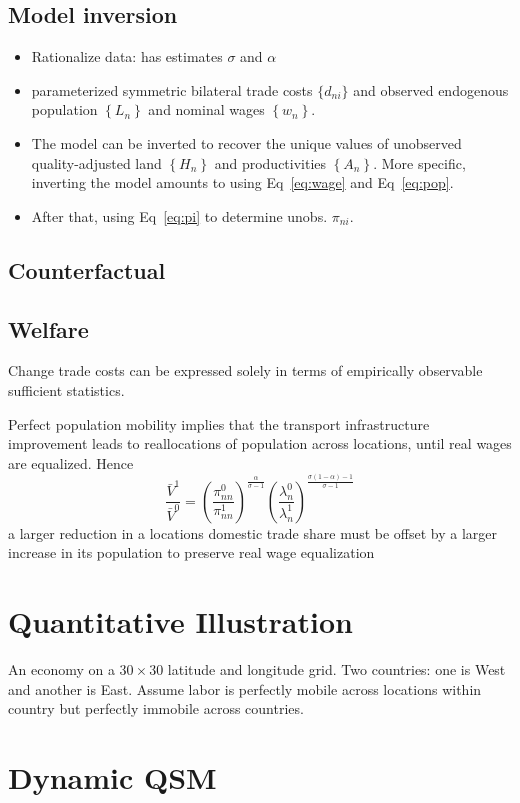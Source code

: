 \documentclass[11pt,a4paper]{article}
\begin{document}
\subsection{Model inversion}
\begin{itemize}
  \item Rationalize data: has estimates $\sigma $ and $\alpha $
  \item parameterized symmetric bilateral trade costs $\{d_{ni}\}$ and observed endogenous population $\left\{ L_n \right\}$ and nominal wages $\left\{ w_n \right\}$.
  \item The model can be inverted to recover the unique values of unobserved quality-adjusted land $\left\{ H_n \right\}$ and productivities $\left\{ A_n \right\}$. More specific, inverting the model amounts to using Eq~\eqref{eq:wage} and Eq~\eqref{eq:pop}. 
  \item After that, using Eq~\eqref{eq:pi} to determine unobs. $\pi _{ni}$.
\end{itemize}


\subsection{Counterfactual}


\subsection{Welfare}
Change trade costs can be expressed solely in terms of empirically observable sufficient statistics. 

Perfect population mobility implies that the transport infrastructure improvement leads to reallocations of population across locations, until real wages are equalized. Hence \begin{equation}
  \frac{\bar{V}^1 }{\bar{V}^0} = \left( \frac{\pi _{nn}^0}{\pi _{nn}^1} \right)^{\frac{\alpha }{\sigma -1}} \left( \frac{\lambda _n^0}{\lambda _n^1} \right)^{\frac{\sigma (1-\alpha ) - 1}{\sigma -1}}
\end{equation}
a larger reduction in a locations domestic trade share must be offset by a larger increase in its population to preserve real wage equalization


\section{Quantitative Illustration}
An economy on a $30 \times 30$ latitude and longitude grid. 
Two countries: one is West and another is East. 
Assume labor is perfectly mobile across locations within country but perfectly immobile across countries. 


\section{Dynamic QSM}
\end{document}
